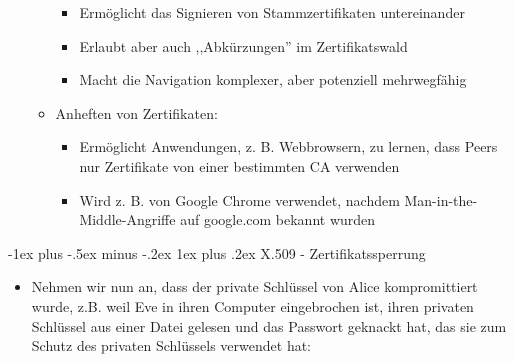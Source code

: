 \documentclass[a4paper]{article}
\makeatletter
\renewcommand{\subsubsection}{\@startsection{subsubsection}{3}{0mm}%
 {-1ex plus -.5ex minus -.2ex}%
 {1ex plus .2ex}%
 {\normalfont\small\bfseries}}
\makeatother
\begin{document}
\begin{multicols}{3}
\begin{itemize}
\begin{itemize}
                        \begin{itemize}
                            \item
                                  Ermöglicht das Signieren von Stammzertifikaten untereinander
                            \item
                                  Erlaubt aber auch ,,Abkürzungen'' im Zertifikatswald
                            \item
                                  Macht die Navigation komplexer, aber potenziell mehrwegfähig
                        \end{itemize}
                  \item
                        Anheften von Zertifikaten:

                        \begin{itemize}
                            \item
                                  Ermöglicht Anwendungen, z. B. Webbrowsern, zu lernen, dass Peers
                                  nur Zertifikate von einer bestimmten CA verwenden
                            \item
                                  Wird z. B. von Google Chrome verwendet, nachdem
                                  Man-in-the-Middle-Angriffe auf google.com bekannt wurden
                        \end{itemize}
              \end{itemize}
    \end{itemize}


    \subsubsection{X.509 -
        Zertifikatssperrung}

    \begin{itemize}
        \item
              Nehmen wir nun an, dass der private Schlüssel von Alice kompromittiert
              wurde, z.B. weil Eve in ihren Computer eingebrochen ist, ihren
              privaten Schlüssel aus einer Datei gelesen und das Passwort geknackt
              hat, das sie zum Schutz des privaten Schlüssels verwendet hat:


\end{itemize}
\end{multicols}
\end{document}
